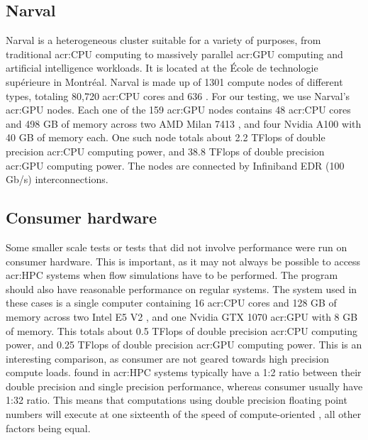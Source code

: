 \subsection{Narval}\label{subsection:results:platforms:narval}

Narval is a heterogeneous cluster suitable for a variety of purposes, from traditional
\acrshort{acr:CPU} computing to massively parallel \acrshort{acr:GPU} computing and artificial
intelligence workloads. It is located at the École de technologie supérieure in Montréal. Narval is
made up of 1301 compute nodes of different types, totaling 80,720 \acrshort{acr:CPU} cores and 636
. For our testing, we use Narval's \acrshort{acr:GPU} nodes. Each one of the 159
\acrshort{acr:GPU} nodes contains 48 \acrshort{acr:CPU} cores and 498 GB of memory across two AMD
Milan 7413 , and four Nvidia A100  with 40 GB of memory
each. One such node totals about 2.2 TFlops of double precision \acrshort{acr:CPU} computing power,
and 38.8 TFlops of double precision \acrshort{acr:GPU} computing power. The nodes are connected by
Infiniband EDR (100 Gb/s) interconnections.

\subsection{Consumer hardware}\label{subsection:results:platforms:consumer}

Some smaller scale tests or tests that did not involve performance were run on consumer hardware.
This is important, as it may not always be possible to access \acrshort{acr:HPC} systems when flow
simulations have to be performed. The program should also have reasonable performance on regular
systems. The system used in these cases is a single computer containing 16 \acrshort{acr:CPU} cores
and 128 GB of memory across two Intel E5 V2 , and one Nvidia GTX
1070 \acrshort{acr:GPU} with 8 GB of memory. This totals about 0.5 TFlops of double precision
\acrshort{acr:CPU} computing power, and 0.25 TFlops of double precision \acrshort{acr:GPU} computing
power. This is an interesting comparison, as consumer  are not geared towards
high precision compute loads.  found in \acrshort{acr:HPC} systems typically
have a 1:2 ratio between their double precision and single precision performance, whereas consumer
 usually have 1:32 ratio. This means that computations using double precision
floating point numbers will execute at one sixteenth of the speed of compute-oriented
, all other factors being equal.

